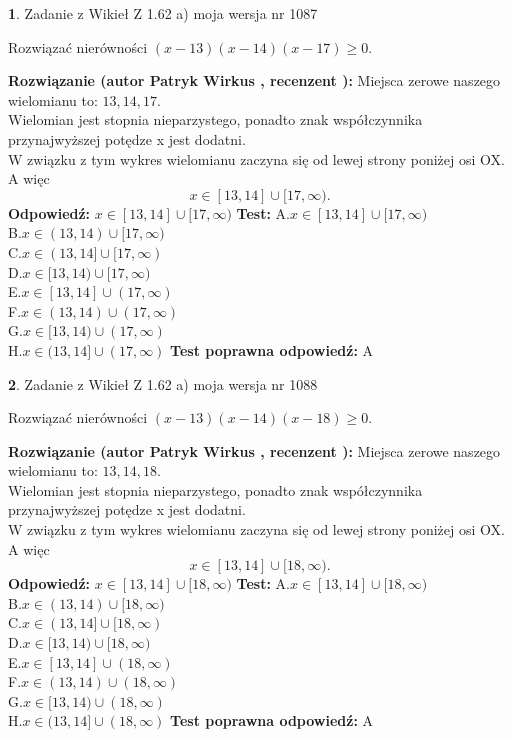 \documentclass[12pt, a4paper]{article}
\theoremstyle{definition} %
\newtheorem{zad}{}
\newcommand{\zadStart}[1]{\begin{zad}#1\newline}
\newcommand{\zadStop}{\end{zad}}
\newcommand{\rozwStart}[2]{\noindent \textbf{Rozwiązanie (autor #1 , recenzent #2): }\newline}
\newcommand{\rozwStop}{\newline}
\newcommand{\odpStart}{\noindent \textbf{Odpowiedź:}\newline}
\newcommand{\odpStop}{\newline}
\newcommand{\testStart}{\noindent \textbf{Test:}\newline}
\newcommand{\testStop}{\newline}
\newcommand{\kluczStart}{\noindent \textbf{Test poprawna odpowiedź:}\newline}
\newcommand{\kluczStop}{\newline}
\begin{document}
\zadStart{Zadanie z Wikieł Z 1.62 a) moja wersja nr 1087}

Rozwiązać nierówności $(x-13)(x-14)(x-17)\ge0$.
\zadStop
\rozwStart{Patryk Wirkus}{}
Miejsca zerowe naszego wielomianu to: $13, 14, 17$.\\
Wielomian jest stopnia nieparzystego, ponadto znak współczynnika przy\linebreak najwyższej potędze x jest dodatni.\\ W związku z tym wykres wielomianu zaczyna się od lewej strony poniżej osi OX. A więc $$x \in [13,14] \cup [17,\infty).$$
\rozwStop
\odpStart
$x \in [13,14] \cup [17,\infty)$
\odpStop
\testStart
A.$x \in [13,14] \cup [17,\infty)$\\
B.$x \in (13,14) \cup [17,\infty)$\\
C.$x \in (13,14] \cup [17,\infty)$\\
D.$x \in [13,14) \cup [17,\infty)$\\
E.$x \in [13,14] \cup (17,\infty)$\\
F.$x \in (13,14) \cup (17,\infty)$\\
G.$x \in [13,14) \cup (17,\infty)$\\
H.$x \in (13,14] \cup (17,\infty)$
\testStop
\kluczStart
A
\kluczStop



\zadStart{Zadanie z Wikieł Z 1.62 a) moja wersja nr 1088}

Rozwiązać nierówności $(x-13)(x-14)(x-18)\ge0$.
\zadStop
\rozwStart{Patryk Wirkus}{}
Miejsca zerowe naszego wielomianu to: $13, 14, 18$.\\
Wielomian jest stopnia nieparzystego, ponadto znak współczynnika przy\linebreak najwyższej potędze x jest dodatni.\\ W związku z tym wykres wielomianu zaczyna się od lewej strony poniżej osi OX. A więc $$x \in [13,14] \cup [18,\infty).$$
\rozwStop
\odpStart
$x \in [13,14] \cup [18,\infty)$
\odpStop
\testStart
A.$x \in [13,14] \cup [18,\infty)$\\
B.$x \in (13,14) \cup [18,\infty)$\\
C.$x \in (13,14] \cup [18,\infty)$\\
D.$x \in [13,14) \cup [18,\infty)$\\
E.$x \in [13,14] \cup (18,\infty)$\\
F.$x \in (13,14) \cup (18,\infty)$\\
G.$x \in [13,14) \cup (18,\infty)$\\
H.$x \in (13,14] \cup (18,\infty)$
\testStop
\kluczStart
A
\kluczStop
\end{document}
